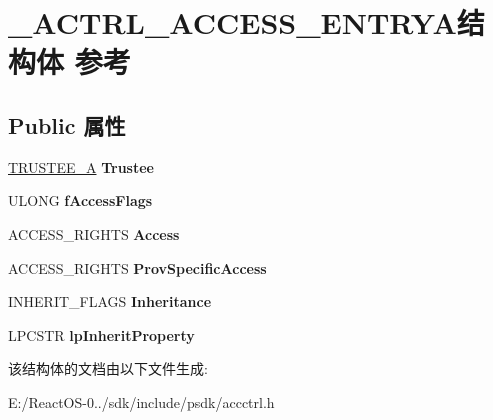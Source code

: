 \hypertarget{struct___a_c_t_r_l___a_c_c_e_s_s___e_n_t_r_y_a}{}\section{\+\_\+\+A\+C\+T\+R\+L\+\_\+\+A\+C\+C\+E\+S\+S\+\_\+\+E\+N\+T\+R\+Y\+A结构体 参考}
\label{struct___a_c_t_r_l___a_c_c_e_s_s___e_n_t_r_y_a}
\subsection*{Public 属性}
\begin{DoxyCompactItemize}
\item 
\mbox{\label{struct___a_c_t_r_l___a_c_c_e_s_s___e_n_t_r_y_a_aa16244344cef915776df0ecff55ead3c}} 
\hyperlink{struct___t_r_u_s_t_e_e___a}{T\+R\+U\+S\+T\+E\+E\+\_\+A} {\bfseries Trustee}
\item 
\mbox{\label{struct___a_c_t_r_l___a_c_c_e_s_s___e_n_t_r_y_a_a04a9b9ef307a05eec45f98afe5600e94}} 
U\+L\+O\+NG {\bfseries f\+Access\+Flags}
\item 
\mbox{\label{struct___a_c_t_r_l___a_c_c_e_s_s___e_n_t_r_y_a_a25b83c017a1f6d07a81d1bf244cf77c0}} 
A\+C\+C\+E\+S\+S\+\_\+\+R\+I\+G\+H\+TS {\bfseries Access}
\item 
\mbox{\label{struct___a_c_t_r_l___a_c_c_e_s_s___e_n_t_r_y_a_abf8eba705f1aea2c02e264466370ca5e}} 
A\+C\+C\+E\+S\+S\+\_\+\+R\+I\+G\+H\+TS {\bfseries Prov\+Specific\+Access}
\item 
\mbox{\label{struct___a_c_t_r_l___a_c_c_e_s_s___e_n_t_r_y_a_adf3560b5023cae7b2f2f0162e0361958}} 
I\+N\+H\+E\+R\+I\+T\+\_\+\+F\+L\+A\+GS {\bfseries Inheritance}
\item 
\mbox{\label{struct___a_c_t_r_l___a_c_c_e_s_s___e_n_t_r_y_a_ab23d71ba5996b7aa1e0cd71179006d8c}} 
L\+P\+C\+S\+TR {\bfseries lp\+Inherit\+Property}
\end{DoxyCompactItemize}


该结构体的文档由以下文件生成\+:\begin{DoxyCompactItemize}
\item 
E\+:/\+React\+O\+S-\/0../sdk/include/psdk/accctrl.\+h\end{DoxyCompactItemize}
